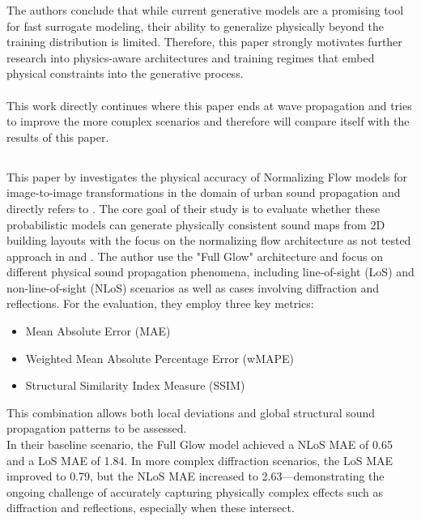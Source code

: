 			The authors conclude that while current generative models are a promising tool for fast surrogate modeling, their ability to generalize physically beyond the training distribution is limited. Therefore, this paper strongly motivates further research into physics-aware architectures and training regimes that embed physical constraints into the generative process.\\
			\\
			This work directly continues where this paper ends at wave propagation and tries to improve the more complex scenarios and therefore will compare itself with the results of this paper.
			
		\subsection{}
			This paper by \citeauthor{achim_eckerle_evaluierung_2025} investigates the physical accuracy of Normalizing Flow models for image-to-image transformations in the domain of urban sound propagation and directly refers to . The core goal of their study is to evaluate whether these probabilistic models can generate physically consistent sound maps from 2D building layouts with the focus on the normalizing flow architecture as not tested approach in  and .
			\newpage
			The author use the "Full Glow" architecture and focus on different physical sound propagation phenomena, including line-of-sight (LoS) and non-line-of-sight (NLoS) scenarios as well as cases involving diffraction and reflections. For the evaluation, they employ three key metrics:
			\begin{itemize}[itemsep=1mm, parsep=0pt]
				\item Mean Absolute Error (MAE)
				\item Weighted Mean Absolute Percentage Error (wMAPE)
				\item Structural Similarity Index Measure (SSIM)
			\end{itemize}
			This combination allows both local deviations and global structural sound propagation patterns to be assessed.\\
			In their baseline scenario, the Full Glow model achieved a NLoS MAE of 0.65 and a LoS MAE of 1.84. In more complex diffraction scenarios, the LoS MAE improved to 0.79, but the NLoS MAE increased to 2.63—demonstrating the ongoing challenge of accurately capturing physically complex effects such as diffraction and reflections, especially when these intersect.\\

